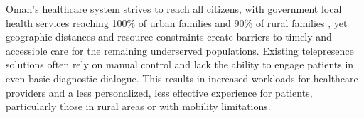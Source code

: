 Oman's healthcare system strives to reach all citizens, with government local health services reaching 100\% of urban families and 90\% of rural families \cite{alsheikhly2006}, yet geographic distances and resource constraints create barriers to timely and accessible care for the remaining underserved populations. Existing telepresence solutions often rely on manual control and lack the ability to engage patients in even basic diagnostic dialogue. This results in increased workloads for healthcare providers and a less personalized, less effective experience for patients, particularly those in rural areas or with mobility limitations.
